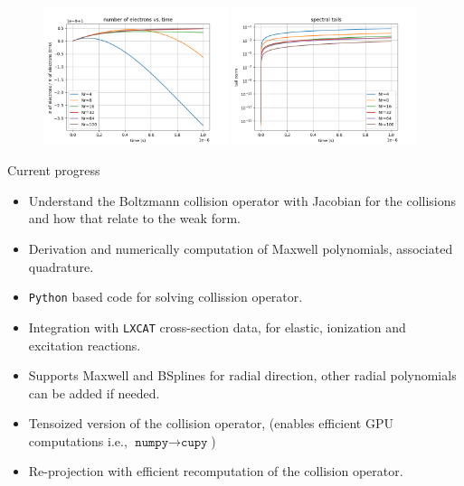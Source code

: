 \documentclass[mathserif, aspectratio=169]{beamer}
\begin{document}
\begin{frame}
\begin{figure}
{			}
			\only<+>
			{
				\includegraphics[width=0.48\textwidth]{g02_mw_mass.png}
				\includegraphics[width=0.48\textwidth]{g02_mw_tails.png}
			}
		\end{figure}
	\end{frame}


	\begin{frame}{Current progress}
		\begin{itemize}
			\item Understand the Boltzmann collision operator with Jacobian for the collisions and how that relate to the weak form. 
			\item Derivation and numerically computation of Maxwell polynomials, associated quadrature. 
			\item \texttt{Python} based code for solving collission operator. 
			\item Integration with \texttt{LXCAT} cross-section data, for elastic, ionization and excitation reactions. 
			\item Supports Maxwell and BSplines for radial direction, other radial polynomials can be added if needed. 
			\item Tensoized version of the collision operator, (enables efficient GPU computations i.e., $\texttt{numpy} \rightarrow \texttt{cupy}$)
			\item Re-projection with efficient recomputation of the collision operator. 
		\end{itemize}
	\end{frame}
\end{document}
